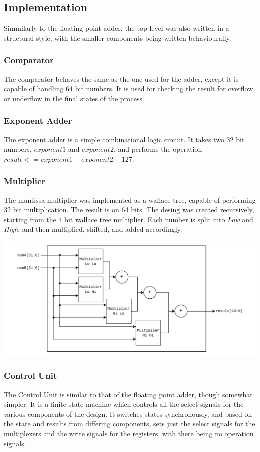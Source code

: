 \documentclass[a4paper,10pt]{article}
\begin{document}
    \newpage
    \subsection{Implementation}
    Simmilarly to the floating point adder, the top level was also written in a structural style, with the smaller components being written behaviourally.

    \subsubsection{Comparator}
    The comparator behaves the same as the one used for the adder, except it is capable of handling 64 bit numbers. It is used for checking the result for overflow or underflow in the final states of the process.

    \subsubsection{Exponent Adder}
    The exponent adder is a simple combinational logic circuit. It takes two 32 bit numbers, $exponent1$ and $exponent2$, and performs the operation\\
    \hspace*{1.0cm}$result <= exponent1 + exponent2 - 127$.

    \subsubsection{Multiplier}
    The mantissa multiplier was implemented as a wallace tree, capable of performing 32 bit multiplication. The result is on 64 bits. The desing was created recursively, starting from the 4 bit wallace tree multiplier. Each number is split into \textit{Low} and \textit{High}, and then multiplied, shifted, and added accordingly.
    \centerline{\includegraphics[scale=0.75]{multiplier.pdf}}

    \subsubsection{Control Unit}
    The Control Unit is similar to that of the floating point adder, though somewhat simpler. It is a finite state machine which controls all the select signals for the various components of the design. It switches states synchronously, and based on the state and results from differing components, sets just the select signals for the multiplexers and the write signals for the registers, with there being no operation signals.
\end{document}
